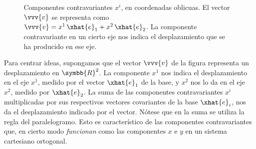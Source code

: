 \begin{figure}[ht]
  \caption{Componentes contravariantes $x^i$, en coordenadas oblicuas. El vector
    $\vvv{v}$ se representa como
    $\vvv{v}=x^1\,\xhat{e}_1+x^2\,\xhat{e}_2$. La componente
    contravariante en un cierto eje nos indica el desplazamiento que se ha producido en
    ese eje.}
  \label{fig:R2-oblic_contrav}
\end{figure}

Para centrar ideas, supongamos que el vector $\vvv{v}$ de la figura representa un
desplazamiento en $\symbb{R}^2$. La componente $x^1$ nos indica el desplazamiento
en el eje $x^1$, medido por el vector $\xhat{e}_1$ de la base, y $x^2$ nos lo da en el
eje $x^2$, medido por $\xhat{e}_2$.
La suma de las componentes contravariantes $x^i$ multiplicadas por sus
respectivos vectores covariantes de la base $\xhat{e}_i$, nos da el desplazamiento
indicado por el vector. Nótese que en la suma se utiliza la regla del paralelogramo.
Esto es característico de las componentes contravariantes que, en cierto modo
\emph{funcionan} como las componentes $x$ e $y$ en un sistema cartesiano ortogonal.


